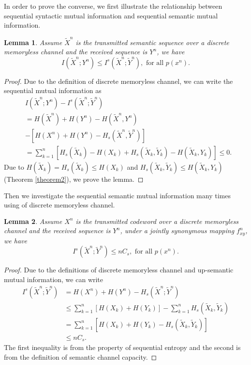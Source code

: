 \documentclass[12pt, draftclsnofoot,onecolumn]{IEEEtran}
\newtheorem{lemma}{\bf{Lemma}}
\begin{document}
In order to prove the converse, we first illustrate the relationship between sequential syntactic mutual information and sequential semantic mutual information.
\begin{lemma}\label{lemma8}
Assume $\tilde{X}^n$ is the transmitted semantic sequence over a discrete memoryless channel and the received sequence is $Y^n$, we have
\begin{equation}
I(\tilde{X}^n; Y^n)\leq I^s(\tilde{X}^n;\tilde{Y}^n), \text{ for all } p(x^n).
\end{equation}
\end{lemma}
\begin{proof}
Due to the definition of discrete memoryless channel, we can write the sequential mutual information as
\begin{equation}
\begin{aligned}
&I(\tilde{X}^n; Y^n)-I^s(\tilde{X}^n;\tilde{Y}^n)\\
&=H(\tilde{X}^n)+H(Y^n)-H(\tilde{X}^n,Y^n)\\
&-\left[H(X^n)+H(Y^n)-H_s(\tilde{X}^n,\tilde{Y}^n)\right]\\
&= \sum_{k=1}^{n} \left[H_s(\tilde{X}_k)-H(X_k)+H_s(\tilde{X}_k,\tilde{Y}_k)-H(\tilde{X}_k,Y_k)\right]\leq 0.
\end{aligned}
\end{equation}
Due to $H(\tilde{X}_k)=H_s(\tilde{X}_k)\leq H(X_k)$ and $H_s(\tilde{X}_k,\tilde{Y}_k)\leq H(\tilde{X}_k,Y_k)$ (Theorem \ref{theorem2}), we prove the lemma.
\end{proof}

Then we investigate the sequential semantic mutual information many times using of discrete memoryless channel.
\begin{lemma}\label{lemma9}
Assume $X^n$ is the transmitted codeword over a discrete memoryless channel and the received sequence is $Y^n$, under a jointly synonymous mapping $f_{xy}^n$, we have
\begin{equation}
I^s(\tilde{X}^n;\tilde{Y}^n)\leq nC_s, \text{ for all } p(x^n).
\end{equation}
\end{lemma}
\begin{proof}
Due to the definitions of discrete memoryless channel and up-semantic mutual information, we can write
\begin{equation}
\begin{aligned}
I^s(\tilde{X}^n;\tilde{Y}^n)&=H(X^n)+H(Y^n)-H_s(\tilde{X}^n;\tilde{Y}^n)\\                                  %
                                         &\leq \sum_{k=1}^{n} \left[H(X_k)+H(Y_k)\right]-\sum_{k=1}^{n} H_s(\tilde{X}_k,\tilde{Y}_k)\\
                                         &=\sum_{k=1}^{n}\left[H(X_k)+H(Y_k)- H_s(\tilde{X}_k,\tilde{Y}_k)\right]\\
                                         &\leq nC_s.
\end{aligned}
\end{equation}
The first inequality is from the property of sequential entropy and the second is from the definition of semantic channel capacity.
\end{proof}
\end{document}
